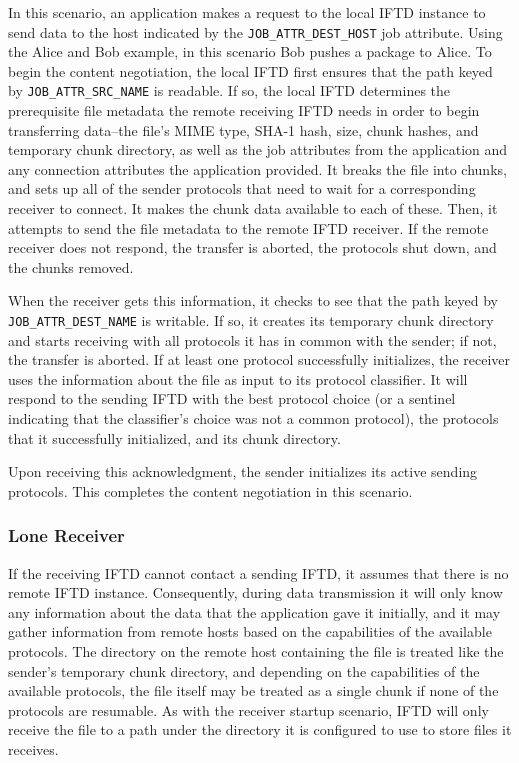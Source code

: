 In this scenario, an application makes a request to the local IFTD instance to send data to the host indicated by the \texttt{JOB\_ATTR\_DEST\_HOST} job attribute.  Using the Alice and Bob example, in this scenario Bob pushes a package to Alice.  To begin the content negotiation, the local IFTD first ensures that the path keyed by \texttt{JOB\_ATTR\_SRC\_NAME} is readable.  If so, the local IFTD determines the prerequisite file metadata the remote receiving IFTD needs in order to begin transferring data--the file's MIME type, SHA-1 hash, size, chunk hashes, and temporary chunk directory, as well as the job attributes from the application and any connection attributes the application provided.  It breaks the file into chunks, and sets up all of the sender protocols that need to wait for a corresponding receiver to connect.  It makes the chunk data available to each of these.  Then, it attempts to send the file metadata to the remote IFTD receiver.  If the remote receiver does not respond, the transfer is aborted, the protocols shut down, and the chunks removed.

When the receiver gets this information, it checks to see that the path keyed by \texttt{JOB\_ATTR\_DEST\_NAME} is writable.  If so, it creates its temporary chunk directory and starts receiving with all protocols it has in common with the sender; if not, the transfer is aborted.  If at least one protocol successfully initializes, the receiver uses the information about the file as input to its protocol classifier.  It will respond to the sending IFTD with the best protocol choice (or a sentinel indicating that the classifier's choice was not a common protocol), the protocols that it successfully initialized, and its chunk directory.

Upon receiving this acknowledgment, the sender initializes its active sending protocols.  This completes the content negotiation in this scenario.

\subsubsection{Lone Receiver}

If the receiving IFTD cannot contact a sending IFTD, it assumes that there is no remote IFTD instance.  Consequently, during data transmission it will only know any information about the data that the application gave it initially, and it may gather information from remote hosts based on the capabilities of the available protocols.  The directory on the remote host containing the file is treated like the sender's temporary chunk directory, and depending on the capabilities of the available protocols, the file itself may be treated as a single chunk if none of the protocols are resumable.  As with the receiver startup scenario, IFTD will only receive the file to a path under the directory it is configured to use to store files it receives.  

